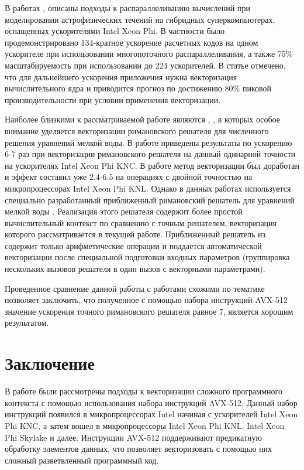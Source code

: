 \documentclass[utf8]{psta}
\begin{document}
В работах \cite{Kulikov}, \cite{Kulikov2} описаны подходы к распараллеливанию вычислений при моделировании астрофизических течений на гибридных суперкомпьютерах, оснащенных ускорителями Intel Xeon Phi.
В частности было продемонстрировано 134-кратное ускорение расчетных кодов на одном ускорителе при использовании многопоточного распараллеливания, а также 75\% масштабируемость при использовании до 224 ускорителей.
В статье отмечено, что для дальнейшего ускорения приложения нужна векторизация вычислительного ядра и приводится прогноз по достижению 80\% пиковой производительности при условии применения векторизации.

Наиболее близкими к рассматриваемой работе являются \cite{BaderSWEVect}, \cite{FerreiraSWEVect}, в которых особое внимание уделяется векторизации римановского решателя для численного решения уравнений мелкой воды.
В работе \cite{BaderSWEVect} приведены результаты по ускорению 6-7 раз при векторизации римановского решателя на данный одинарной точности на ускорителях Intel Xeon Phi KNC.
В работе \cite{FerreiraSWEVect} метод векторизации был доработан и эффект составил уже 2.4-6.5 на операциях с двойной точностью на микропроцессорах Intel Xeon Phi KNL.
Однако в данных работах используется специально разработанный приближенный римановский решатель для уравнений мелкой воды \cite{George}.
Реализация этого решателя содержит более простой вычислительный контекст по сравнению с точным решателем, векторизация которого рассматривается в текущей работе.
Приближенный решатель из \cite{George} содержит только арифметические операции и поддается автоматической векторизации после специальной подготовки входных параметров (группировка нескольких вызовов решателя в один вызов с векторными параметрами).

Проведенное сравнение данной работы с работами схожими по тематике позволяет заключить, что полученное с помощью набора инструкций AVX-512 значение ускорения точного римановского решателя равное 7, является хорошим результатом.

\section*{Заключение}

В работе были рассмотрены подходы к векторизации сложного программного контекста с помощью использования набора инструкций AVX-512.
Данный набор инструкций появился в микропроцессорах Intel начиная с ускорителей Intel Xeon Phi KNC, а затем вошел в микропроцессоры Intel Xeon Phi KNL, Intel Xeon Phi Skylake и далее.
Инструкции AVX-512 поддерживают предикатную обработку элементов данных, что позволяет векторизовать с помощью них сложный разветвленный программный код.
\end{document}
